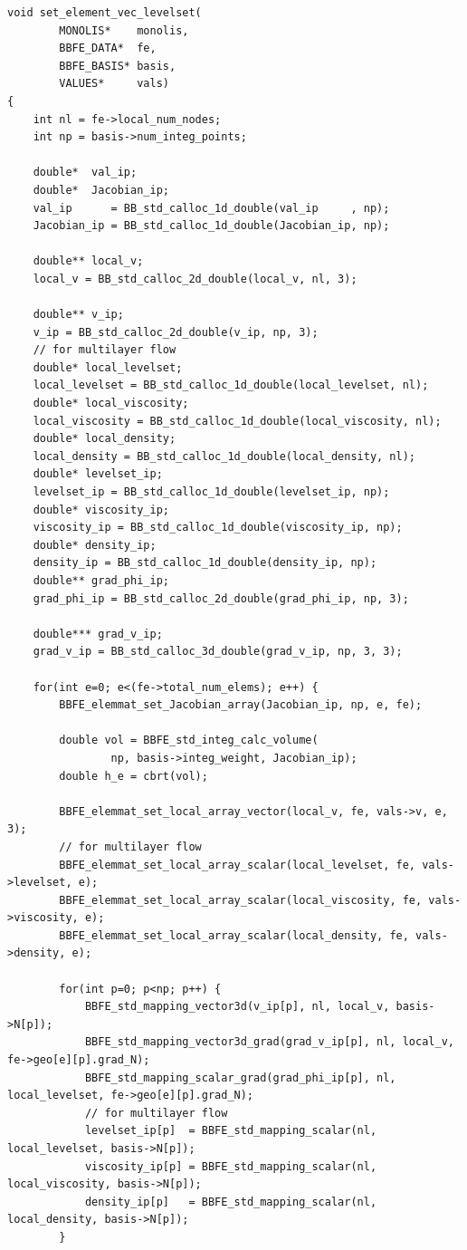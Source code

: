 \documentclass[8pt,a4paper]{article}
\begin{document}
\begin{lstlisting}[caption = mlflow\_fs.cの中のレベルセット関数の右辺ベクトルを計算する関数]
void set_element_vec_levelset(
		MONOLIS*	monolis,
		BBFE_DATA*	fe,
		BBFE_BASIS* basis,
		VALUES*		vals)
{
	int nl = fe->local_num_nodes;
	int np = basis->num_integ_points;

	double*  val_ip;
	double*  Jacobian_ip;
	val_ip      = BB_std_calloc_1d_double(val_ip     , np);
	Jacobian_ip = BB_std_calloc_1d_double(Jacobian_ip, np);

	double** local_v;
	local_v = BB_std_calloc_2d_double(local_v, nl, 3);

	double** v_ip; 
	v_ip = BB_std_calloc_2d_double(v_ip, np, 3);
	// for multilayer flow
	double* local_levelset;
	local_levelset = BB_std_calloc_1d_double(local_levelset, nl);
	double* local_viscosity;
	local_viscosity = BB_std_calloc_1d_double(local_viscosity, nl);
	double* local_density;
	local_density = BB_std_calloc_1d_double(local_density, nl);
	double* levelset_ip;
	levelset_ip = BB_std_calloc_1d_double(levelset_ip, np);
	double* viscosity_ip;
	viscosity_ip = BB_std_calloc_1d_double(viscosity_ip, np);
	double* density_ip;
	density_ip = BB_std_calloc_1d_double(density_ip, np);
	double** grad_phi_ip;
	grad_phi_ip = BB_std_calloc_2d_double(grad_phi_ip, np, 3);

	double*** grad_v_ip;
	grad_v_ip = BB_std_calloc_3d_double(grad_v_ip, np, 3, 3);

	for(int e=0; e<(fe->total_num_elems); e++) {
		BBFE_elemmat_set_Jacobian_array(Jacobian_ip, np, e, fe);

		double vol = BBFE_std_integ_calc_volume(
				np, basis->integ_weight, Jacobian_ip);
		double h_e = cbrt(vol);

		BBFE_elemmat_set_local_array_vector(local_v, fe, vals->v, e, 3);
		// for multilayer flow
		BBFE_elemmat_set_local_array_scalar(local_levelset, fe, vals->levelset, e);
		BBFE_elemmat_set_local_array_scalar(local_viscosity, fe, vals->viscosity, e);
		BBFE_elemmat_set_local_array_scalar(local_density, fe, vals->density, e);

		for(int p=0; p<np; p++) {
			BBFE_std_mapping_vector3d(v_ip[p], nl, local_v, basis->N[p]);
			BBFE_std_mapping_vector3d_grad(grad_v_ip[p], nl, local_v, fe->geo[e][p].grad_N);
			BBFE_std_mapping_scalar_grad(grad_phi_ip[p], nl, local_levelset, fe->geo[e][p].grad_N);
			// for multilayer flow
			levelset_ip[p]  = BBFE_std_mapping_scalar(nl, local_levelset, basis->N[p]);
			viscosity_ip[p] = BBFE_std_mapping_scalar(nl, local_viscosity, basis->N[p]);
			density_ip[p]   = BBFE_std_mapping_scalar(nl, local_density, basis->N[p]);
		}


\end{lstlisting}
\end{document}
